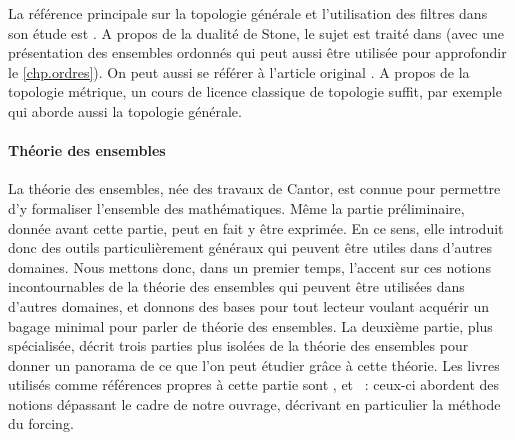 \begin{itemize}
  La référence principale sur la topologie générale et l'utilisation des filtres
  dans son étude est \cite{bourbaki1971topologie}. A propos de la dualité de
  Stone, le sujet est traité dans \cite{DBLP:books/daglib/0093287} (avec une
  présentation des ensembles ordonnés qui peut aussi être utilisée pour
  approfondir le \cref{chp.ordres}). On peut aussi se référer à l'article
  original \cite{f4995f83-4889-37da-940a-f0a9e09b91e6}. A propos de la topologie
  métrique, un cours de licence classique de topologie suffit, par exemple
  \cite{hassan2021topologie} qui aborde aussi la topologie générale.
\end{itemize}

\paragraph{Théorie des ensembles}
La théorie des ensembles, née des travaux de Cantor, est connue pour permettre
d'y formaliser l'ensemble des mathématiques. Même la partie préliminaire, donnée
avant cette partie, peut en fait y être exprimée. En ce sens, elle introduit
donc des outils particulièrement généraux qui peuvent être utiles dans d'autres
domaines. Nous mettons donc, dans un premier temps, l'accent sur ces notions
incontournables de la théorie des ensembles qui peuvent être utilisées dans
d'autres domaines, et donnons des bases pour tout lecteur voulant acquérir un
bagage minimal pour parler de théorie des ensembles. La deuxième partie, plus
spécialisée, décrit trois parties plus isolées de la théorie des ensembles pour
donner un panorama de ce que l'on peut étudier grâce à cette théorie. Les livres
utilisés comme références propres à cette partie sont \cite{krivine1998théorie},
et \cite{DBLP:books/daglib/0067194}~: ceux-ci abordent des notions dépassant le
cadre de notre ouvrage, décrivant en particulier la méthode du forcing.

